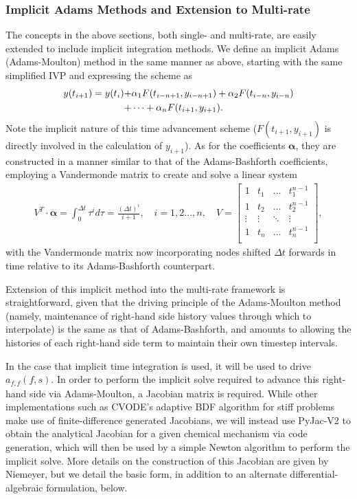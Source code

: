 \subsubsection{Implicit Adams Methods and Extension to Multi-rate}

The concepts in the above sections, both single- and multi-rate, are
easily extended to include implicit integration methods. We define an
implicit Adams (Adams-Moulton) method in the same manner as above, starting
with the same simplified IVP  and expressing the scheme as
\begin{align}
y(t_{i+1}) = y(t_{i}) +& \alpha_{1}F(t_{i-n+1},y_{i-n+1}) + \alpha_{2}F(t_{i-n},y_{i-n}) \notag \\
+& \cdots + \alpha_{n}F(t_{i+1},y_{i+1}). \label{eq:am_general}
\end{align}
Note the implicit nature of this time advancement scheme ($F(t_{i+1}, y_{i+1})$ is
directly involved in the calculation of $y_{i+1}$). As for the coefficients
$\boldsymbol{\alpha}$, they are constructed in a manner similar to that of
the Adams-Bashforth coefficients, employing a Vandermonde matrix to
create and solve a linear system
\begin{align}
V^{T} \cdot \boldsymbol{\alpha} = \int_0^{\Delta t} \tau^{i} d\tau = \frac{(\Delta t)^{i}}{i+1}, \quad i = 1,2...,n, \quad V = \begin{bmatrix}
    1 & t_{1} &  \hdots   & t_{1}^{n-1}  \\
    1 & t_{2} & \hdots &  t_{2}^{n-1} \\
      \vdots  & \vdots  &  \ddots   &  \vdots   \\
       1 &   t_{n}  &  \hdots  & t_{n}^{n-1} \\
        \end{bmatrix}, \label{eq:vandermonde_implicit}
\end{align}
with the Vandermonde matrix now incorporating nodes shifted $\Delta t$ forwards
in time relative to its Adams-Bashforth counterpart.

Extension of this implicit method into the multi-rate framework is
straightforward, given that the driving principle of the Adams-Moulton
method (namely, maintenance of right-hand side history values through
which to interpolate) is the same as that of Adams-Bashforth, and amounts to
allowing the histories of each right-hand side term to maintain their
own timestep intervals.

In the case that implicit time integration is used, it will be used
to drive $a_{f,f}(f,s)$. In order to perform the implicit solve required
to advance this right-hand side via Adams-Moulton, a Jacobian matrix
is required. While other implementations such as CVODE's adaptive BDF
algorithm for stiff problems make use of finite-difference generated
Jacobians, we will instead use PyJac-V2 to obtain the analytical Jacobian
for a given chemical mechanism via code generation, which will then
be used by a simple Newton algorithm to perform the implicit solve. More
details on the construction of this Jacobian are given by Niemeyer, but we
detail the basic form, in addition to an alternate differential-algebraic
formulation, below.

